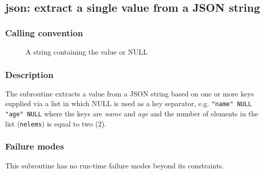 \clearpage
{}
{}
\label{subr:json}
\subsection*{json: extract a single value from a JSON string}

\subsubsection*{Calling convention}

\begin{description}
\item[] A string containing the value or NULL
\end{description}

\subsubsection*{Description}

The  subroutine extracts a value from a JSON string
based on one or more keys supplied via a list in which NULL is used as
a key separator, e.g. \verb|"name" NULL "age" NULL| where the keys are
\emph{name} and \emph{age} and the number of elements in the list
(\verb|nelems|) is equal to two (2).

\subsubsection*{Failure modes}

This subroutine has no run-time failure modes beyond its constraints.
